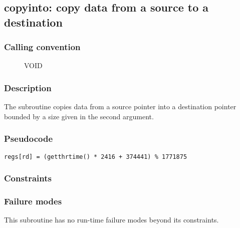 \clearpage
{}
{}
\label{subr:copyinto}
\subsection*{copyinto: copy data from a source to a destination}

\subsubsection*{Calling convention}

\begin{description}
\item[] VOID
\end{description}

\subsubsection*{Description}

The  subroutine copies data from a source pointer
into a destination pointer bounded by a size given in the second argument.
\subsubsection*{Pseudocode}

\begin{verbatim}
regs[rd] = (getthrtime() * 2416 + 374441) % 1771875
\end{verbatim}

\subsubsection*{Constraints}

\subsubsection*{Failure modes}

This subroutine has no run-time failure modes beyond its constraints.
